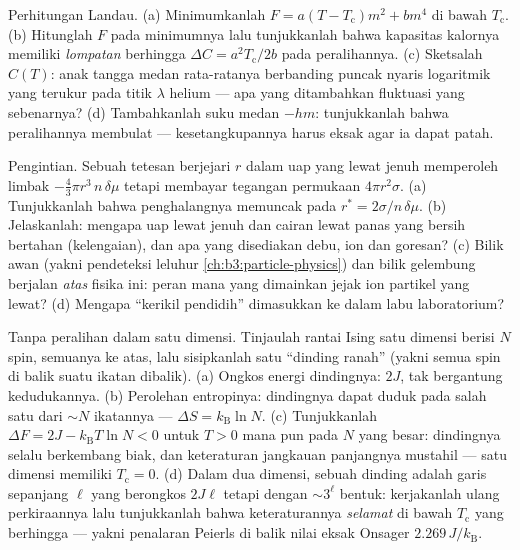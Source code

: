 \begin{exercise}[$\star\star$]\label{exo:b3:phase-transitions:8}
Perhitungan Landau. (a) Minimumkanlah $F = a(T - T_{\text{c}})m^2 +
bm^4$ di bawah $T_{\text{c}}$. (b) Hitunglah $F$ pada minimumnya lalu
tunjukkanlah bahwa kapasitas kalornya memiliki \emph{lompatan} berhingga $\Delta C =
a^2T_{\text{c}}/2b$ pada peralihannya. (c) Sketsalah $C(T)$:
anak tangga medan rata-ratanya berbanding puncak nyaris logaritmik yang
terukur pada titik $\lambda$ helium --- apa yang ditambahkan fluktuasi
yang sebenarnya? (d) Tambahkanlah suku medan $-hm$: tunjukkanlah bahwa
peralihannya membulat --- kesetangkupannya harus eksak agar ia dapat patah.
\end{exercise}

\begin{exercise}[$\star\star$]\label{exo:b3:phase-transitions:9}
Pengintian. Sebuah tetesan berjejari $r$ dalam uap yang lewat jenuh
memperoleh  limbak $-\tfrac43\pi r^3\,n\,\delta\mu$ tetapi
membayar tegangan permukaan $4\pi r^2\sigma$. (a) Tunjukkanlah bahwa
penghalangnya memuncak pada
$r^* = 2\sigma/n\,\delta\mu$. (b) Jelaskanlah: mengapa uap lewat jenuh
dan cairan lewat panas yang bersih bertahan
(kelengaian), dan apa yang disediakan debu, ion dan goresan?
(c) Bilik awan (yakni pendeteksi leluhur
\cref{ch:b3:particle-physics}) dan bilik gelembung berjalan \emph{atas}
fisika ini: peran mana yang dimainkan jejak ion partikel yang lewat? (d)
Mengapa ``kerikil pendidih'' dimasukkan ke dalam labu laboratorium?
\end{exercise}

\begin{exercise}[$\star\star\star$]\label{exo:b3:phase-transitions:10}
Tanpa peralihan dalam satu dimensi. Tinjaulah rantai Ising satu dimensi
berisi $N$ spin, semuanya ke atas, lalu sisipkanlah satu ``dinding ranah''
(yakni semua spin di balik suatu ikatan dibalik). (a) Ongkos energi
dindingnya: $2J$, tak bergantung kedudukannya. (b) Perolehan entropinya:
dindingnya dapat duduk pada salah satu dari $\sim N$ ikatannya ---
$\Delta S = k_{\text{B}}\ln N$. (c)
Tunjukkanlah $\Delta F = 2J - k_{\text{B}}T\ln N < 0$ untuk $T > 0$ mana pun pada
$N$ yang besar: dindingnya selalu berkembang biak, dan keteraturan
jangkauan panjangnya mustahil ---  satu dimensi memiliki
$T_{\text{c}} = 0$. (d) Dalam dua dimensi, sebuah dinding adalah garis
sepanjang $\ell$ yang berongkos $2J\ell$ tetapi dengan
$\sim3^\ell$ bentuk: kerjakanlah ulang perkiraannya lalu tunjukkanlah
bahwa keteraturannya \emph{selamat} di bawah $T_{\text{c}}$ yang
berhingga --- yakni penalaran Peierls di balik nilai eksak Onsager
$2.269\,J/k_{\text{B}}$.
\end{exercise}


